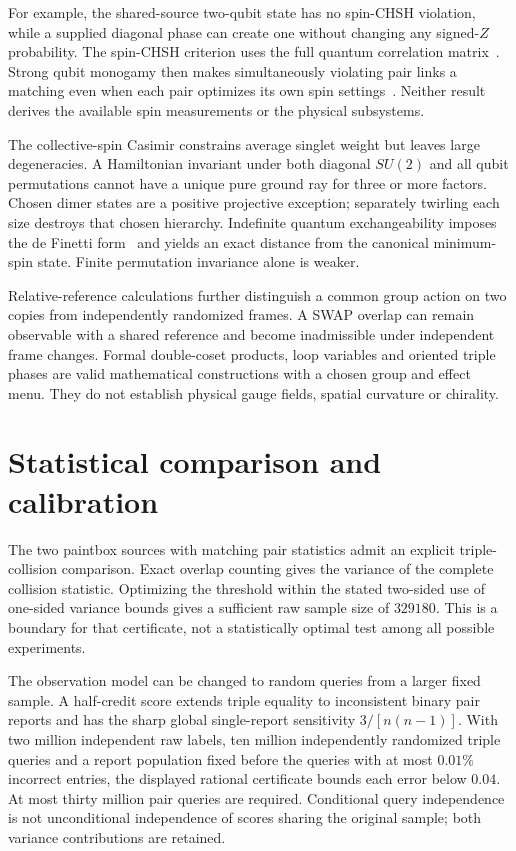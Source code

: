 For example, the shared-source two-qubit state has no spin-CHSH violation, while a supplied diagonal phase can create one without changing any signed-$Z$ probability. The spin-CHSH criterion uses the full quantum correlation matrix~\cite{horodecki}. Strong qubit monogamy then makes simultaneously violating pair links a matching even when each pair optimizes its own spin settings~\cite{chenghall}. Neither result derives the available spin measurements or the physical subsystems.

The collective-spin Casimir constrains average singlet weight but leaves large degeneracies. A Hamiltonian invariant under both diagonal $SU(2)$ and all qubit permutations cannot have a unique pure ground ray for three or more factors. Chosen dimer states are a positive projective exception; separately twirling each size destroys that chosen hierarchy. Indefinite quantum exchangeability imposes the de Finetti form~\cite{caves} and yields an exact distance from the canonical minimum-spin state. Finite permutation invariance alone is weaker.

Relative-reference calculations further distinguish a common group action on two copies from independently randomized frames. A SWAP overlap can remain observable with a shared reference and become inadmissible under independent frame changes. Formal double-coset products, loop variables and oriented triple phases are valid mathematical constructions with a chosen group and effect menu. They do not establish physical gauge fields, spatial curvature or chirality.

\section{Statistical comparison and calibration}
\label{col:statistics}

The two paintbox sources with matching pair statistics admit an explicit triple-collision comparison. Exact overlap counting gives the variance of the complete collision statistic. Optimizing the threshold within the stated two-sided use of one-sided variance bounds gives a sufficient raw sample size of $329180$. This is a boundary for that certificate, not a statistically optimal test among all possible experiments.

The observation model can be changed to random queries from a larger fixed sample. A half-credit score extends triple equality to inconsistent binary pair reports and has the sharp global single-report sensitivity $3/[n(n-1)]$. With two million independent raw labels, ten million independently randomized triple queries and a report population fixed before the queries with at most $0.01\%$ incorrect entries, the displayed rational certificate bounds each error below $0.04$. At most thirty million pair queries are required. Conditional query independence is not unconditional independence of scores sharing the original sample; both variance contributions are retained.

